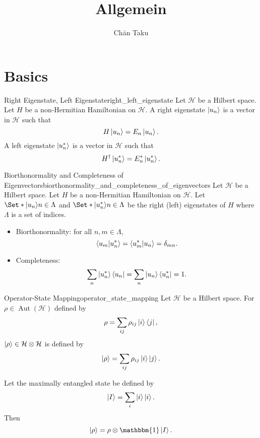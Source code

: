 \documentclass{article}
\title{Allgemein}
\author{Ch\=an Taku}
\begin{document}
\maketitle

\section{Basics}

\begin{definition}{Right Eigenstate, Left Eigenstate}{right_left_eigenstate}
    Let $\mathcal{H}$ be a Hilbert space.
    Let $H$ be a non-Hermitian Hamiltonian on $\mathcal{H}$.
    A right eigenstate $\ket{u_n}$ is a vector in $\mathcal{H}$ such that
    \[ H\ket{u_n} = E_n\ket{u_n}. \]
    A left eigenstate $\ket{u_n^*}$ is a vector in $\mathcal{H}$ such that
    \[ H^\dagger\ket{u^*_n} = E^*_n\ket{u^*_n}. \]
\end{definition}

\begin{theorem}{Biorthonormality and Completeness of Eigenvectors}{biorthonormality_and_completeness_of_eigenvectors}
    Let $\mathcal{H}$ be a Hilbert space.
    Let $H$ be a non-Hermitian Hamiltonian on $\mathcal{H}$.
    Let $\Set*{\ket{u_n}}{n\in \Lambda}$ and $\Set*{\ket{u^*_n}}{n\in\Lambda}$ be the right (left) eigenstates of $H$ where $\Lambda$ is a set of indices.
    \begin{itemize}
        \item Biorthonormality: for all $n,m\in\Lambda$,
        \[ \bra{u_m}\ket{u^*_n} = \bra{u^*_m}\ket{u_n} = \delta_{mn}. \]
        \item Completeness:
        \[ \sum_n \ket{u^*_n} \bra{u_n} = \sum_n \ket{u_n} \bra{u^*_n} = 1. \]
    \end{itemize}
\end{theorem}

\begin{definition}{Operator-State Mapping}{operator_state_mapping}
    Let $\mathcal{H}$ be a Hilbert space.
    For $\rho\in\operatorname{Aut}(\mathcal{H})$ defined by
    \[ \rho = \sum_{ij} \rho_{ij} \ket{i}\bra{j}, \]
    $\ket{\rho}\in \mathcal{H}\otimes \mathcal{H}$ is defined by
    \[ \ket{\rho} = \sum_{ij} \rho_{ij} \ket{i}\ket{j}. \]
\end{definition}

Let the maximally entangled state be defined by
\[ \ket{I} = \sum_{i}\ket{i}\ket{i}. \]
Then
\[ \ket{\rho} = \rho \otimes \mathbbm{1} \ket{I}. \]
\end{document}
